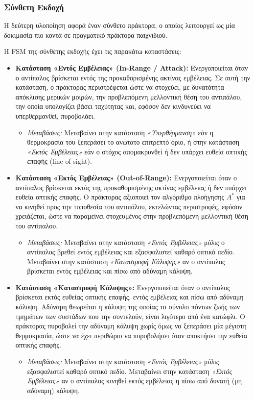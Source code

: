 \documentclass[12pt]{article}
\begin{document}
\subsubsection{Σύνθετη Εκδοχή}
Η δεύτερη υλοποίηση αφορά έναν σύνθετο πράκτορα, ο οποίος λειτουργεί ως μία δοκιμασία πιο κοντά σε πραγματικό πράκτορα παιχνιδιού.

Η FSM της σύνθετης εκδοχής έχει τις παρακάτω καταστάσεις:
\begin{itemize}
    \item \textbf{Κατάσταση «Εντός Εμβέλειας» (In-Range / Attack):} 
    Ενεργοποιείται όταν ο αντίπαλος βρίσκεται εντός της προκαθορισμένης ακτίνας εμβέλειας. Σε αυτή την κατάσταση, ο πράκτορας περιστρέφεται ώστε να στοχεύει, με δυνατότητα απόκλισης μερικών μοιρών, την προβλεπόμενη μελλοντική θέση του αντιπάλου, την οποία υπολογίζει βάσει ταχύτητας και, εφόσον δεν κινδυνεύει να υπερθερμανθεί, πυροβολάει.
    \begin{itemize}
        \item \textit{Μεταβάσεις:} Μεταβαίνει στην κατάσταση \textit{«Υπερθέρμανση»} εάν η θερμοκρασία του ξεπεράσει το ανώτατο επιτρεπτό όριο, ή στην κατάσταση \textit{«Εκτός Εμβέλειας»} εάν ο στόχος απομακρυνθεί ή δεν υπάρχει ευθεία οπτικής επαφής (line of sight).
    \end{itemize}

    \item \textbf{Κατάσταση «Εκτός Εμβέλειας» (Out-of-Range):} 
    Ενεργοποιείται όταν ο αντίπαλος βρίσκεται εκτός της προκαθορισμένης ακτίνας εμβέλειας ή δεν υπάρχει ευθεία οπτικής επαφής. Ο πράκτορας αξιοποιεί τον αλγόριθμο πλοήγησης $A^*$ για να κινηθεί προς την τοποθεσία του αντιπάλου, εκτελώντας περιστροφές, εφόσον χρειάζεται, ώστε να παραμείνει στοχευμένος στην προβλεπόμενη μελλοντική θέση του αντίπαλου.
    \begin{itemize}
        \item \textit{Μεταβάσεις:} Μεταβαίνει στην κατάσταση \textit{«Εντός Εμβέλειας»} μόλις ο αντίπαλος βρεθεί εντός εμβέλειας και εξασφαλιστεί καθαρό οπτικό πεδίο.
        Μεταβαίνει στην κατάσταση \textit{«Καταστροφή Κάλυψης»} αν ο αντίπαλος βρίσκεται εντός εμβέλειας και πίσω από αδύναμη κάλυψη.
    \end{itemize}

    \item \textbf{Κατάσταση «Καταστροφή Κάλυψης»:}
    Ενεργοποιείται όταν ο αντίπαλος βρίσκεται εκτός ευθείας οπτικής επαφής, εντός εμβέλειας και πίσω από αδύναμη κάλυψη. Αδύναμη θεωρείται η κάλυψη της οποίας το σύνολο πόντων ζωής των τμημάτων των συστάδων που την συντελούν, είναι λιγότερο από ένα κατώφλι. Ο πράκτορας πυροβολεί την αδύναμη κάλυψη χωρίς όμως να ξεπεράσει μία μέγιστη θερμοκρασία, ώστε να έχει περιθώριο να πυροβολήσει όταν αποκτήσει την ευθεία οπτικής επαφής.
    \begin{itemize}
        \item \textit{Μεταβάσεις:} Μεταβαίνει στην κατάσταση \textit{«Εντός Εμβέλειας»} μόλις εξασφαλιστεί καθαρό οπτικό πεδίο.
        Μεταβαίνει στην κατάσταση \textit{«Εκτός Εμβέλειας»} αν ο αντίπαλος κινηθεί εκτός εμβέλειας η πίσω από δυνατή (μη αδύναμη) κάλυψη.
    \end{itemize}


\end{itemize}
\end{document}
